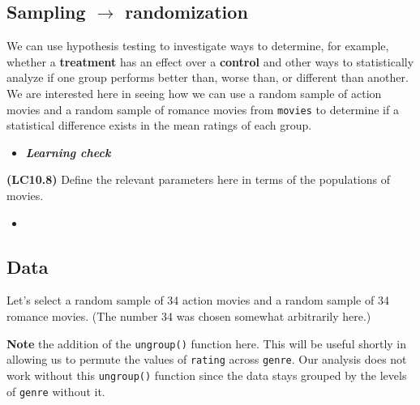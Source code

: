 \documentclass[12pt,]{krantz}
\makeatletter
\newenvironment{Shaded}{\begin{snugshade}}{\end{snugshade}}
\newcommand{\KeywordTok}[1]{\textcolor[rgb]{0.27,0.27,0.27}{\textbf{#1}}}
\newcommand{\DecValTok}[1]{\textcolor[rgb]{0.06,0.06,0.06}{#1}}
\newcommand{\StringTok}[1]{\textcolor[rgb]{0.5,0.5,0.5}{#1}}
\newcommand{\OperatorTok}[1]{\textcolor[rgb]{0.43,0.43,0.43}{\textbf{#1}}}
\newcommand{\NormalTok}[1]{#1}
\newenvironment{kframe}{%
\medskip{}
\setlength{\fboxsep}{.8em}
 \def\at@end@of@kframe{}%
 \ifinner\ifhmode%
  \def\at@end@of@kframe{\end{minipage}}%
  \begin{minipage}{\columnwidth}%
 \fi\fi%
 \def\FrameCommand##1{\hskip\@totalleftmargin \hskip-\fboxsep
 \colorbox{shadecolor}{##1}\hskip-\fboxsep
     \hskip-\linewidth \hskip-\@totalleftmargin \hskip\columnwidth}%
 \MakeFramed {\advance\hsize-\width
   \@totalleftmargin\z@ \linewidth\hsize
   \@setminipage}}%
 {\par\unskip\endMakeFramed%
 \at@end@of@kframe}
\renewenvironment{Shaded}{\begin{kframe}}{\end{kframe}}
\newenvironment{rmdblock}[1]
  {\begin{shaded*}
  \begin{itemize}
  \renewcommand{\labelitemi}{
    \raisebox{-.7\height}[0pt][0pt]{
    }
  }
  \item
  }
  {
  \end{itemize}
  \end{shaded*}
  }
\newenvironment{learncheck}
  {\begin{rmdblock}{warning}}
  {\end{rmdblock}}
\theoremstyle{definition}
\theoremstyle{definition}
\theoremstyle{definition}
\theoremstyle{remark}
\makeatother
\begin{document}
\subsection{\texorpdfstring{Sampling \(\rightarrow\)
randomization}{Sampling \textbackslash{}rightarrow randomization}}\label{sampling-rightarrow-randomization}

We can use hypothesis testing to investigate ways to determine, for
example, whether a \textbf{treatment} has an effect over a
\textbf{control} and other ways to statistically analyze if one group
performs better than, worse than, or different than another. We are
interested here in seeing how we can use a random sample of action
movies and a random sample of romance movies from \texttt{movies} to
determine if a statistical difference exists in the mean ratings of each
group.

\begin{learncheck}
\textbf{\emph{Learning check}}
\end{learncheck}

\textbf{(LC10.8)} Define the relevant parameters here in terms of the
populations of movies.

\begin{learncheck}

\end{learncheck}

\subsection{Data}\label{data}

Let's select a random sample of 34 action movies and a random sample of
34 romance movies. (The number 34 was chosen somewhat arbitrarily here.)

\begin{Shaded}
\end{Shaded}

\textbf{Note} the addition of the \texttt{ungroup()} function here. This
will be useful shortly in allowing us to permute the values of
\texttt{rating} across \texttt{genre}. Our analysis does not work
without this \texttt{ungroup()} function since the data stays grouped by
the levels of \texttt{genre} without it.
\end{document}
